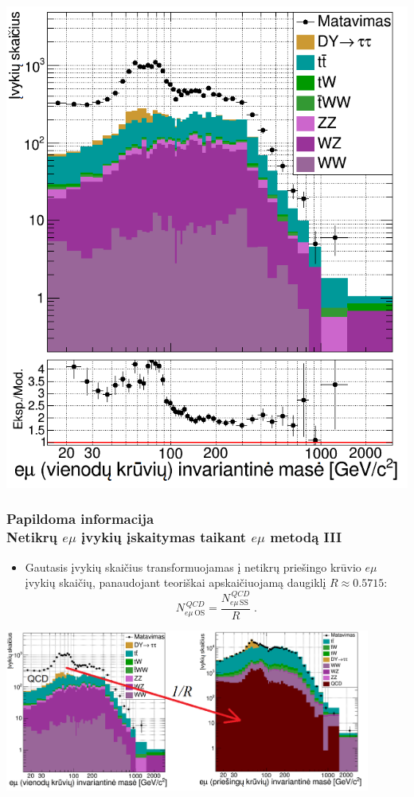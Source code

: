 \documentclass[xcolor=dvipsnames]{beamer}
\newcommand{\emu}{\mathit{e}\mu}
\newcommand{\QCD}{\mathit{QCD}}
\begin{document}
\begin{frame}
\begin{minipage}{0.44\textwidth}
		\includegraphics[width=\linewidth]{emuMassSS_SMALL.png}
	\end{minipage}
\end{frame}


\begin{frame}
	\frametitle{Papildoma informacija\\ \small Netikrų $\emu$ įvykių įskaitymas taikant $\emu$ metodą III}
	\begin{itemize}
		\item Gautasis įvykių skaičius transformuojamas į netikrų priešingo krūvio $\emu$ įvykių skaičių, panaudojant teoriškai apskaičiuojamą
		daugiklį $\mathit{R} \approx 0.5715$:
		\begin{equation*}
			\mathit{N}_{\emu \, \mathrm{OS}}^{\,\QCD} = \frac{\mathit{N}_{\emu \, \mathrm{SS}}^{\,\QCD}}{\mathit{R}} \; .
		\end{equation*}
	\end{itemize}
	\centering
	\includegraphics[width=0.9\textwidth]{emuMassSStoOS.png}
\end{frame}
\end{document}
